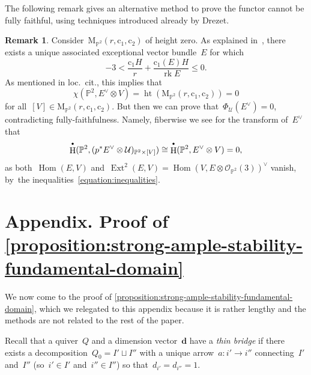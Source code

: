 \documentclass[JEP,XML,SOM,Unicode,NoEqCountersInSection,published]{cedram}
\newcommand{\sbullet}{{\scriptscriptstyle\bullet}}
\newcommand{\csbullet}{{\raisebox{1pt}{$\sbullet$}}}
\theoremstyle{plain}
\theoremstyle{definition}
\newtheorem{remark}[theorem]{Remark}
\DeclareMathOperator\Ext{Ext}
\DeclareMathOperator\HH{H}
\DeclareMathOperator\Hom{Hom}
\DeclareMathOperator\rk{rk}
\newcommand\moduli{\ensuremath{\mathrm{M}}}
\newcommand\tuple[1]{\ensuremath{{\boldsymbol{#1}}}}
\begin{document}
The following remark gives an alternative method to prove
the functor cannot be fully faithful,
using techniques introduced already by Drezet.
\begin{remark}
\label{remark:associated-exceptional-bundle}
Consider~$\moduli_{\mathbb{P}^2}(r,\mathrm{c}_1,\mathrm{c}_2)$ of height zero.
As explained in~\cite[\S5.1]{MR0916199},
there exists a unique associated exceptional vector bundle~$E$
for which
\begin{equation}
\label{equation:inequalities}
-3<\frac{\mathrm{c}_1H}{r}+\frac{\mathrm{c}_1(E)H}{\rk E}\leq 0.
\end{equation}
As mentioned in loc.~cit.,
this implies that
\begin{equation*}
\chi(\mathbb{P}^2,E^\vee\otimes V)=\operatorname{ht}(\moduli_{\mathbb{P}^2}(r,\mathrm{c}_1,\mathrm{c}_2))=0
\end{equation*}
for all~$[V]\in\moduli_{\mathbb{P}^2}(r,\mathrm{c}_1,\mathrm{c}_2)$.
But then we can prove that~$\Phi_{\mathcal{U}}(E^\vee)=0$,
contradicting fully-faithfulness.
Namely, fiberwise we see for the transform of~$E^\vee$ that
\begin{equation*}
\HH^\csbullet(\mathbb{P}^2,(p^*E^\vee\otimes\mathcal{U})_{\mathbb{P}^2\times[V]})
\cong
\HH^\csbullet(\mathbb{P}^2,E^\vee\otimes V)
=
0,
\end{equation*}
as both~$\Hom(E,V)$ and~$\Ext^2(E,V)=\Hom(V,E\otimes\mathcal{O}_{\mathbb{P}^2}(3))^\vee$ vanish, by~the inequalities~\eqref{equation:inequalities}.
\end{remark}

\appendix

\section*{Appendix. Proof of \texorpdfstring{\cref{proposition:strong-ample-stability-fundamental-domain}}{Proposition \ref{proposition:strong-ample-stability-fundamental-domain}}}
\label{section:proof-no-thin-bridges}
We now come to the proof of \cref{proposition:strong-ample-stability-fundamental-domain},
which we relegated to this appendix because it is rather lengthy
and the methods are not related to the rest of the paper.

Recall that a quiver~$Q$ and a dimension vector~$\tuple{d}$
have a \emph{thin bridge}
if there exists a decomposition~$Q_0=I'\sqcup I''$
with a unique arrow~$a\colon i'\to i''$ connecting~$I'$ and~$I''$
(so~$i'\in I'$ and~$i''\in I''$)
so that~$d_{i'}=d_{i''}=1$.
\end{document}
